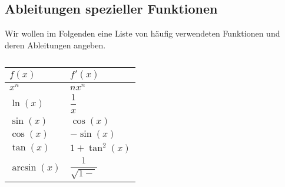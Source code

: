 \subsection{Ableitungen spezieller Funktionen}

Wir wollen im Folgenden eine Liste von häufig verwendeten Funktionen und deren Ableitungen angeben. 

\begin{table}[htp]
    \caption{}
    \label{}
    \begin{tabular}{l l}
        \toprule
        $f(x)$ & $f'(x)$ \\
        \midrule 
        $x^n$ & $n x^n$ \\
        $\ln(x)$ & $\dfrac{1}{x}$ \\
        $\sin(x)$ & $\cos(x)$ \\
        $\cos(x)$ & $-\sin(x)$ \\ 
        $\tan(x)$ & $1 + \tan^2(x)$ \\
        $\arcsin(x)$ & $\dfrac{1}{\sqrt{1-}}$
    \end{tabular}
\end{table}


